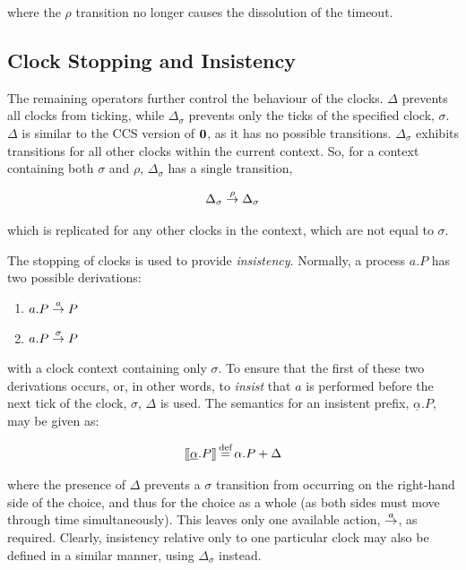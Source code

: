 \noindent where the $\rho$ transition no longer causes the dissolution
of the timeout.

\subsection{Clock Stopping and Insistency}
\label{clockcontrol}

The remaining operators further control the behaviour of the clocks.
$\Delta$ prevents all clocks from ticking, while $\Delta_{\sigma}$
prevents only the ticks of the specified clock, $\sigma$.  $\Delta$ is
similar to the CCS version of $\textbf{0}$, as it has no possible
transitions.  $\Delta_{\sigma}$ exhibits transitions for all other
clocks within the current context.  So, for a context containing both
$\sigma$ and $\rho$, $\Delta_{\sigma}$ has a single transition,

\begin{equation}
  \Delta_{\sigma} \stackrel{\rho}{\rightarrow} \Delta_{\sigma}
\end{equation}

\noindent which is replicated for any other clocks in the context,
which are not equal to $\sigma$.

The stopping of clocks is used to provide \emph{insistency}.  Normally,
a process $a.P$ has two possible derivations:

\begin{enumerate}
  \item $a.P \stackrel{a}{\rightarrow} P$
  \item $a.P \stackrel{\sigma}{\rightarrow} P$
\end{enumerate}

\noindent with a clock context containing only $\sigma$.  To ensure
that the first of these two derivations occurs, or, in other words, to
\emph{insist} that $a$ is performed before the next tick of the clock,
$\sigma$, $\Delta$ is used.  The semantics for an insistent prefix,
$\underline{\alpha}.P$, may be given as:

\begin{equation}
[\hspace{-0.3ex}[ \underline{\alpha}.P ]\hspace{-0.3ex}] \operatorname{\stackrel{\textrm{def}}{=}} \alpha.P + \Delta 
\end{equation}

\noindent where the presence of $\Delta$ prevents a $\sigma$
transition from occurring on the right-hand side of the choice, and
thus for the choice as a whole (as both sides must move through time
simultaneously).  This leaves only one available action,
$\stackrel{a}{\rightarrow}$, as required.  Clearly, insistency relative only to one
particular clock may also be defined in a similar manner, using
$\Delta_{\sigma}$ instead.

